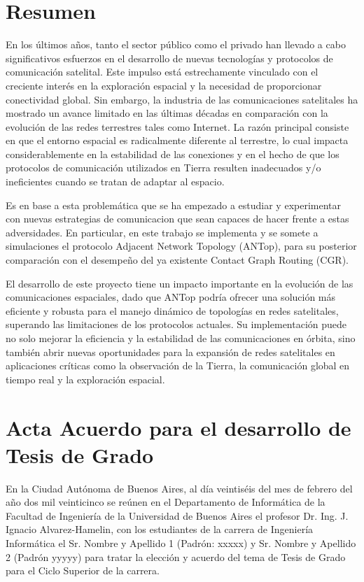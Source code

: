 \section{Resumen}
En los últimos años, tanto el sector público como el privado han llevado a cabo significativos esfuerzos en el desarrollo de nuevas tecnologías y protocolos de comunicación satelital. Este impulso está estrechamente vinculado con el creciente interés en la exploración espacial y la necesidad de proporcionar conectividad global. Sin embargo, la industria de las comunicaciones satelitales ha mostrado un avance limitado en las últimas décadas en comparación con la evolución de las redes terrestres tales como Internet. La razón principal consiste en que el entorno espacial es radicalmente diferente al terrestre, lo cual impacta considerablemente en la estabilidad de las conexiones y en el hecho de que los protocolos de comunicación utilizados en Tierra resulten inadecuados y/o ineficientes cuando se tratan de adaptar al espacio.

Es en base a esta problemática que se ha empezado a estudiar y experimentar con nuevas estrategias de comunicacion que sean capaces de hacer frente a estas adversidades. En particular, en este trabajo se implementa y se somete a simulaciones el protocolo Adjacent Network Topology (ANTop), para su posterior comparación con el desempeño del ya existente Contact Graph Routing (CGR).

El desarrollo de este proyecto tiene un impacto importante en la evolución de las comunicaciones espaciales, dado que ANTop podría ofrecer una solución más eficiente y robusta para el manejo dinámico de topologías en redes satelitales, superando las limitaciones de los protocolos actuales. Su implementación puede no solo mejorar la eficiencia y la estabilidad de las comunicaciones en órbita, sino también abrir nuevas oportunidades para la expansión de redes satelitales en aplicaciones críticas como la observación de la Tierra, la comunicación global en tiempo real y la exploración espacial.

\section{Acta Acuerdo para el desarrollo de Tesis de Grado}

En la Ciudad Autónoma de Buenos Aires, al día veintiséis del mes de febrero del año dos mil
veinticinco se reúnen en el Departamento de Informática de la Facultad de Ingeniería de la Universidad
de Buenos Aires el profesor Dr. Ing. J. Ignacio Alvarez-Hamelin, con
los estudiantes de la carrera de Ingeniería Informática el Sr. Nombre y Apellido 1 (Padrón: xxxxx) y Sr. Nombre y Apellido 2 (Padrón yyyyy) para tratar la
elección y acuerdo del tema de Tesis de Grado para el Ciclo Superior de la carrera.


